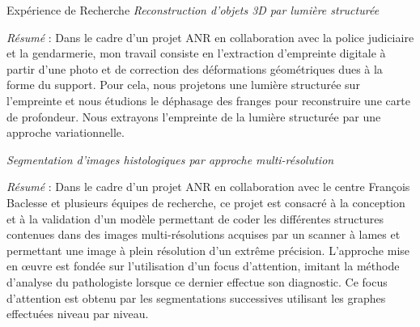 \begin{rubric}{Expérience de Recherche}
   \entry*[2010-2011]
  \textit{Reconstruction d'objets 3D par lumière structurée}\newline
  
  \textit{Résumé} : Dans le cadre d'un projet ANR en collaboration
  avec la police judiciaire et la gendarmerie, mon travail consiste en
  l'extraction d'empreinte digitale à partir d'une photo et de
  correction des déformations géométriques dues à la forme du support.  
  Pour cela, nous projetons une lumière structurée sur l'empreinte et nous
  étudions le déphasage des franges pour reconstruire une carte de
  profondeur. Nous extrayons l'empreinte de la lumière
  structurée par une approche variationnelle. \newline 

  \entry*[2009-2010]
  \textit{Segmentation d'images histologiques par approche multi-résolution}\newline
  
  \textit{Résumé} : Dans le cadre d'un projet ANR en collaboration
  avec le centre François Baclesse et plusieurs équipes de recherche,
  ce projet est consacré à la conception et à la validation d'un
  modèle permettant de coder les différentes structures contenues dans
  des images multi-résolutions acquises par un scanner à lames et
  permettant une image à plein résolution d'un extrême
  précision. L'approche mise en \oe uvre est fondée sur l'utilisation
  d'un focus d'attention, imitant la méthode d'analyse du pathologiste
  lorsque ce dernier effectue son diagnostic. Ce focus d'attention
  est obtenu par les segmentations successives utilisant les graphes
  effectuées niveau par niveau. \newline



\end{rubric}
